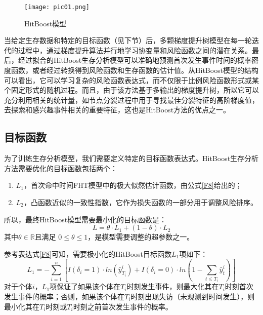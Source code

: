 \begin{figure}[h]
\texttt{[image: pic01.png]}
\caption{HitBoost模型}
\label{pic01}
\end{figure}

当给定生存数据和特定的目标函数（见下节）后，多颗梯度提升树模型在每一轮迭代的过程中，通过梯度提升算法并行地学习协变量和风险函数之间的潜在关系。最后，经过拟合的HitBoost生存分析模型可以准确地预测首次发生事件时间的概率密度函数，或者经过转换得到风险函数和生存函数的估计值。从HitBoost模型的结构可以看出，它可以学习复杂的风险函数表达式，而不仅限于比例风险函数形式或某个固定形式的随机过程。而且，由于该方法基于多输出的梯度提升树，所以它可以充分利用相关的统计量，如节点分裂过程中用于寻找最佳分裂特征的高阶梯度值，去探索和感兴趣事件相关的重要特征，这也是HitBoost方法的优点之一。

\subsection{目标函数}

为了训练生存分析模型，我们需要定义特定的目标函数表达式。HitBoost生存分析方法需要优化的目标函数包括两个：
\begin{enumerate}
    \item $L_1$，首次命中时间FHT模型中的极大似然估计函数，由公式\eqref{F8}给出的；
    \item $L_2$，凸函数近似的一致性指数，它作为损失函数的一部分用于调整风险排序。
\end{enumerate}
所以，最终HitBoost模型需要最小化的目标函数是：
\begin{equation}
L=\theta \cdot L_1 + (1-\theta) \cdot L_2 \label{F33}
\end{equation}
其中$\theta \in \mathbb{R}$且满足 $0 \le \theta \le 1$，是模型需要调整的超参数之一。
 
参考表达式\eqref{F8}可知，需要极小化的HitBoost目标函数$L_1$项如下：$$
L_1 = -\sum_{i=1}^{n} \left[ I(\delta_i=1)\cdot ln(\hat{y}_{T_i}^i) + I(\delta_i=0)\cdot ln(1-\sum_{t\le T_i}\hat{y}_t^i) \right]
$$ 
对于个体$i$，$L_1$项保证了如果该个体在$T_i$时刻发生事件，则最大化其在$T_i$时刻首次发生事件的概率；否则，如果该个体在$T_i$时刻出现失访（未观测到时间发生），则最小化其在$T_i$时刻或$T_i$时刻之前首次发生事件的概率。


